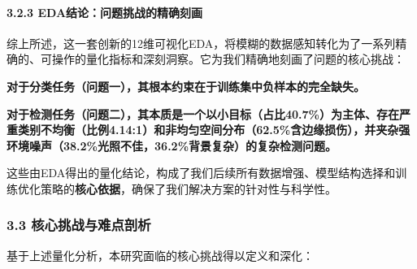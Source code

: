\documentclass[
]{article}
\begin{document}
\paragraph{\texorpdfstring{\textbf{3.2.3
EDA结论：问题挑战的精确刻画}}{3.2.3 EDA结论：问题挑战的精确刻画}}\label{323-edaux7ed3ux8bbaux95eeux9898ux6311ux6218ux7684ux7cbeux786eux523bux753b}

综上所述，这一套创新的12维可视化EDA，将模糊的数据感知转化为了一系列精确的、可操作的量化指标和深刻洞察。它为我们精确地刻画了问题的核心挑战：

\textbf{对于分类任务（问题一），其根本约束在于训练集中负样本的完全缺失。}

\textbf{对于检测任务（问题二），其本质是一个以小目标（占比40.7\%）为主体、存在严重类别不均衡（比例4.14:1）和非均匀空间分布（62.5\%含边缘损伤），并夹杂强环境噪声（38.2\%光照不佳，36.2\%背景复杂）的复杂检测问题。}

这些由EDA得出的量化结论，构成了我们后续所有数据增强、模型结构选择和训练优化策略的\textbf{核心依据}，确保了我们解决方案的针对性与科学性。

\subsubsection{3.3
核心挑战与难点剖析}\label{33-ux6838ux5fc3ux6311ux6218ux4e0eux96beux70b9ux5256ux6790}

基于上述量化分析，本研究面临的核心挑战得以定义和深化：
\end{document}
